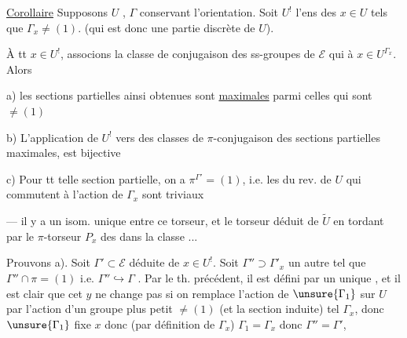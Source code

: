 

\uline{Corollaire} Supposons  $U$ ,  $\Gamma$ conservant l'orientation. Soit $U^!$ l'ens des $x\in U$ tels que $\Gamma_x\ne(1)$. (qui est donc une partie discrète de $U$).

À tt $x\in U^!$, associons la classe de conjugaison des ss-groupes de $\mathcal E$  qui  à  $x\in U^{\Gamma_x}$. Alors

 a)  les sections partielles ainsi obtenues sont \uline{maximales} parmi celles qui sont $\ne(1)$

 b) L'application de $U^!$ vers  des classes de $\pi$-conjugaison des sections partielles   maximales, est bijective


 c) Pour tt telle section partielle, on a $\pi^{\Gamma'}=(1)$, i.e. les   du rev.   de $U$ qui commutent à l'action de $\Gamma_x$ sont triviaux

--- il y a un isom. unique  entre ce torseur, et le torseur déduit de $\widetilde U$ en tordant par le $\pi$-torseur  $P_x$ des  dans la classe  \unsure{$[\Gamma']$}...


Prouvons a). Soit \(\Gamma'\subset\mathcal E\)
déduite de \(x\in U^!\).
Soit \(\Gamma''\supset\Gamma'_x\) un autre 
tel que \(\Gamma''\cap\pi=(1)\) i.e. \(\Gamma''\hookrightarrow\Gamma\)
.
Par le th. précédent, il est défini par un unique
,
et il est clair que cet \(y\) ne change pas si on remplace l'action de
\(\unsure{\Gamma_1}\) sur \(U\) par l'action d'un groupe plus petit
\(\ne(1)\) (et la section induite) tel \(\Gamma_x\),
donc \(\unsure{\Gamma_1}\)  fixe \(x\) donc
(par définition de \(\Gamma_x\)) \(\Gamma_1=\Gamma_x\) donc
\(\Gamma''=\Gamma'\), 

